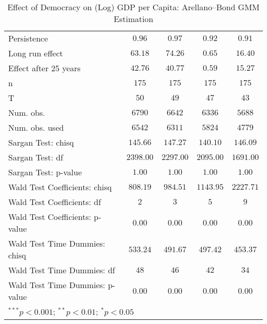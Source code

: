 \begin{table}
\begin{center}
\begin{tabular}{l c c c c}
\hline
Persistence                     & $0.96$       & $0.97$       & $0.92$       & $0.91$       \\
Long run effect                 & $63.18$      & $74.26$      & $0.65$       & $16.40$      \\
Effect after 25 years           & $42.76$      & $40.77$      & $0.59$       & $15.27$      \\
n                               & $175$        & $175$        & $175$        & $175$        \\
T                               & $50$         & $49$         & $47$         & $43$         \\
Num. obs.                       & $6790$       & $6642$       & $6336$       & $5688$       \\
Num. obs. used                  & $6542$       & $6311$       & $5824$       & $4779$       \\
Sargan Test: chisq              & $145.66$     & $147.27$     & $140.10$     & $146.09$     \\
Sargan Test: df                 & $2398.00$    & $2297.00$    & $2095.00$    & $1691.00$    \\
Sargan Test: p-value            & $1.00$       & $1.00$       & $1.00$       & $1.00$       \\
Wald Test Coefficients: chisq   & $808.19$     & $984.51$     & $1143.95$    & $2227.71$    \\
Wald Test Coefficients: df      & $2$          & $3$          & $5$          & $9$          \\
Wald Test Coefficients: p-value & $0.00$       & $0.00$       & $0.00$       & $0.00$       \\
Wald Test Time Dummies: chisq   & $533.24$     & $491.67$     & $497.42$     & $453.37$     \\
Wald Test Time Dummies: df      & $48$         & $46$         & $42$         & $34$         \\
Wald Test Time Dummies: p-value & $0.00$       & $0.00$       & $0.00$       & $0.00$       \\
\hline
\multicolumn{5}{l}{\scriptsize{$^{***}p<0.001$; $^{**}p<0.01$; $^{*}p<0.05$}}
\end{tabular}
\caption{Effect of Democracy on (Log) GDP per Capita: Arellano–Bond GMM Estimation}
\label{table:coefficients}
\end{center}
\end{table}
